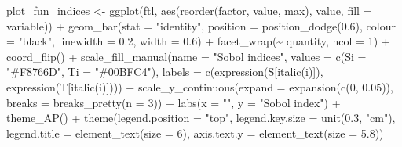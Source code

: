 \documentclass[
  11pt,
]{article}
\newenvironment{Shaded}{\begin{snugshade}}{\end{snugshade}}
\newcommand{\AttributeTok}[1]{\textcolor[rgb]{0.77,0.63,0.00}{#1}}
\newcommand{\DecValTok}[1]{\textcolor[rgb]{0.00,0.00,0.81}{#1}}
\newcommand{\FloatTok}[1]{\textcolor[rgb]{0.00,0.00,0.81}{#1}}
\newcommand{\FunctionTok}[1]{\textcolor[rgb]{0.00,0.00,0.00}{#1}}
\newcommand{\NormalTok}[1]{#1}
\newcommand{\OtherTok}[1]{\textcolor[rgb]{0.56,0.35,0.01}{#1}}
\newcommand{\SpecialCharTok}[1]{\textcolor[rgb]{0.00,0.00,0.00}{#1}}
\newcommand{\StringTok}[1]{\textcolor[rgb]{0.31,0.60,0.02}{#1}}
\begin{document}
\begin{Shaded}
\begin{Highlighting}[]
\NormalTok{plot\_fun\_indices }\OtherTok{\textless{}{-}} \FunctionTok{ggplot}\NormalTok{(ftl, }\FunctionTok{aes}\NormalTok{(}\FunctionTok{reorder}\NormalTok{(factor, value, max), value, }\AttributeTok{fill =}\NormalTok{ variable)) }\SpecialCharTok{+}
  \FunctionTok{geom\_bar}\NormalTok{(}\AttributeTok{stat =} \StringTok{"identity"}\NormalTok{, }\AttributeTok{position =} \FunctionTok{position\_dodge}\NormalTok{(}\FloatTok{0.6}\NormalTok{), }\AttributeTok{colour =} \StringTok{"black"}\NormalTok{,}
           \AttributeTok{linewidth =} \FloatTok{0.2}\NormalTok{, }\AttributeTok{width =} \FloatTok{0.6}\NormalTok{) }\SpecialCharTok{+}
  \FunctionTok{facet\_wrap}\NormalTok{(}\SpecialCharTok{\textasciitilde{}}\NormalTok{ quantity, }\AttributeTok{ncol =} \DecValTok{1}\NormalTok{) }\SpecialCharTok{+}
  \FunctionTok{coord\_flip}\NormalTok{() }\SpecialCharTok{+}
  \FunctionTok{scale\_fill\_manual}\NormalTok{(}\AttributeTok{name =} \StringTok{"Sobol\textquotesingle{} indices"}\NormalTok{,}
                    \AttributeTok{values =} \FunctionTok{c}\NormalTok{(}\AttributeTok{Si =} \StringTok{"\#F8766D"}\NormalTok{, }\AttributeTok{Ti =} \StringTok{"\#00BFC4"}\NormalTok{),}
                    \AttributeTok{labels =} \FunctionTok{c}\NormalTok{(}\FunctionTok{expression}\NormalTok{(S[}\FunctionTok{italic}\NormalTok{(i)]), }\FunctionTok{expression}\NormalTok{(T[}\FunctionTok{italic}\NormalTok{(i)]))) }\SpecialCharTok{+}
  \FunctionTok{scale\_y\_continuous}\NormalTok{(}\AttributeTok{expand =} \FunctionTok{expansion}\NormalTok{(}\FunctionTok{c}\NormalTok{(}\DecValTok{0}\NormalTok{, }\FloatTok{0.05}\NormalTok{)),}
                     \AttributeTok{breaks =} \FunctionTok{breaks\_pretty}\NormalTok{(}\AttributeTok{n =} \DecValTok{3}\NormalTok{)) }\SpecialCharTok{+}
  \FunctionTok{labs}\NormalTok{(}\AttributeTok{x =} \StringTok{""}\NormalTok{, }\AttributeTok{y =} \StringTok{"Sobol\textquotesingle{} index"}\NormalTok{) }\SpecialCharTok{+}
  \FunctionTok{theme\_AP}\NormalTok{() }\SpecialCharTok{+}
  \FunctionTok{theme}\NormalTok{(}\AttributeTok{legend.position =} \StringTok{"top"}\NormalTok{, }\AttributeTok{legend.key.size =} \FunctionTok{unit}\NormalTok{(}\FloatTok{0.3}\NormalTok{, }\StringTok{"cm"}\NormalTok{),}
        \AttributeTok{legend.title =} \FunctionTok{element\_text}\NormalTok{(}\AttributeTok{size =} \DecValTok{6}\NormalTok{), }\AttributeTok{axis.text.y =} \FunctionTok{element\_text}\NormalTok{(}\AttributeTok{size =} \FloatTok{5.8}\NormalTok{))}
\end{Highlighting}
\end{Shaded}
\end{document}
